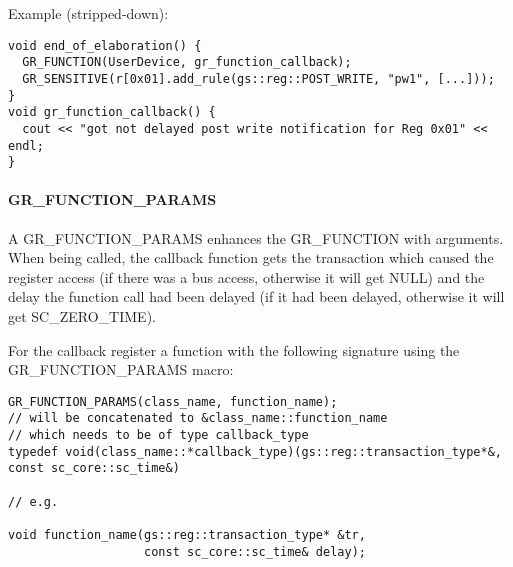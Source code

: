 Example (stripped-down):
\begin{lstlisting}
void end_of_elaboration() {
  GR_FUNCTION(UserDevice, gr_function_callback);
  GR_SENSITIVE(r[0x01].add_rule(gs::reg::POST_WRITE, "pw1", [...]));
}
void gr_function_callback() {
  cout << "got not delayed post write notification for Reg 0x01" << endl;
}
\end{lstlisting}

\paragraph{GR\_FUNCTION\_PARAMS} 
A {\sffamily GR\_FUNCTION\_PARAMS} enhances the {\sffamily GR\_FUNCTION} with arguments. When being called, the callback function gets the transaction which caused the register access (if there was a bus access, otherwise it will get NULL) and the delay the function call had been delayed (if it had been delayed, otherwise it will get {\sffamily SC\_ZERO\_TIME}).




For the callback register a function with the following signature using the {\sffamily GR\_FUNCTION\_PARAMS} macro: \vspace{-.5em}
\begin{lstlisting}
GR_FUNCTION_PARAMS(class_name, function_name); 
// will be concatenated to &class_name::function_name
// which needs to be of type callback_type
typedef void(class_name::*callback_type)(gs::reg::transaction_type*&, const sc_core::sc_time&)

// e.g.

void function_name(gs::reg::transaction_type* &tr, 
                   const sc_core::sc_time& delay);
\end{lstlisting}

